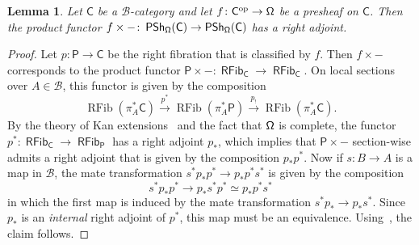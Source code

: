 \documentclass[reqno]{amsart}
\numberwithin{equation}{subsection}
\theoremstyle{plain}
\newtheorem{lemma}[equation]{Lemma}
\theoremstyle{definition}
\let\scr=\mathcal
\def\BB{\scr B}
\DeclareMathOperator{\IPSh}{\mathsf{PSh}}
\DeclareMathOperator{\RFib}{RFib}
\DeclareMathOperator{\IRFib}{\mathsf{RFib}}
\newcommand{\op}{\mathrm{op}}
\newcommand{\I}[1]{\mathsf{#1}}
\begin{document}
\begin{lemma}
	\label{lem:productFunctorCocontinuous}
	Let $\I{C}$ be a $\BB$-category and let $f\colon\I{C}^{\op}\to\Univ$ be a presheaf on $\I{C}$. Then the product functor $f\times-\colon\IPSh_{\Univ}(\I{C})\to\IPSh_{\Univ}(\I{C})$ has a right adjoint.
\end{lemma}
\begin{proof}
	Let $p\colon \I{P}\to\I{C}$ be the right fibration that is classified by $f$. Then $f\times -$ corresponds to the product functor $\I{P}\times -\colon \IRFib_{\I{C}}\to\IRFib_{\I{C}}$. On local sections over $A\in\BB$, this functor is given by the composition
	\begin{equation*}
	\RFib(\pi_A^\ast\I{C})\xrightarrow{p^\ast} \RFib(\pi_A^\ast\I{P})\xrightarrow{p_!} \RFib(\pi_A^\ast\I{C}).
	\end{equation*}
	By the theory of Kan extensions~\cite[\S~6]{Martini2021a} and the fact that $\Univ$ is complete, the functor $p^\ast\colon \IRFib_{\I{C}}\to\IRFib_{\I{P}}$ has a right adjoint $p_\ast$, which implies that $\I{P}\times -$ section-wise admits a right adjoint that is given by the composition $p_\ast p^\ast$. Now if $s\colon B\to A$ is a map in $\BB$, the mate transformation $s^\ast p_\ast p^\ast\to p_\ast p^\ast s^\ast$ is given by the composition
	\begin{equation*}
	s^\ast p_\ast p^\ast \to p_\ast s^\ast p^\ast\simeq  p_\ast p^\ast s^\ast
	\end{equation*}
	in which the first map is induced by the mate transformation $s^\ast p_\ast \to p_\ast s^\ast$. Since $p_\ast$ is an \emph{internal} right adjoint of $p^\ast$, this map must be an equivalence. Using~\cite[Proposition~3.2.8]{Martini2021a}, the claim follows.
\end{proof}
\end{document}
